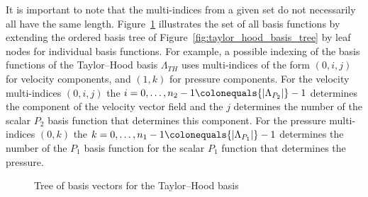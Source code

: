\documentclass[a4paper,10pt,headings=normal,bibliography=totoc]{scrartcl}
\newcommand{\abs}[1]{{\lvert#1\rvert}}
\begin{document}
It is important to note that the multi-indices from a given set do not necessarily
all have the same length.
Figure~\ref{fig:taylor_hood_basis_function_tree} illustrates the set of all basis
functions by extending the ordered basis tree of Figure~\ref{fig:taylor_hood_basis_tree}
by leaf nodes for individual basis functions.
For example, a possible indexing of the basis functions of the Taylor--Hood basis $\Lambda_{TH}$
uses multi-indices of the form $(0,i,j)$ for velocity components, and $(1,k)$
for pressure components.
For the velocity multi-indices $(0,i,j)$ the $i = 0,\dots,n_2-1 \colonequals \abs{\Lambda_{P_2}}-1$ determines the component
of the velocity vector field and the $j$ determines the number of the scalar $P_2$ basis
function that determines this component.
For the pressure multi-indices $(0,k)$ the $k= 0,\dots,n_1-1 \colonequals \abs{\Lambda_{P_1}}-1$ determines the number of the $P_1$ basis
function for the scalar $P_1$ function that determines the pressure.

\begin{figure}
    \begin{center}
    \end{center}
    \caption{Tree of basis vectors for the Taylor--Hood basis}
    \label{fig:taylor_hood_basis_function_tree}
\end{figure}
\end{document}
